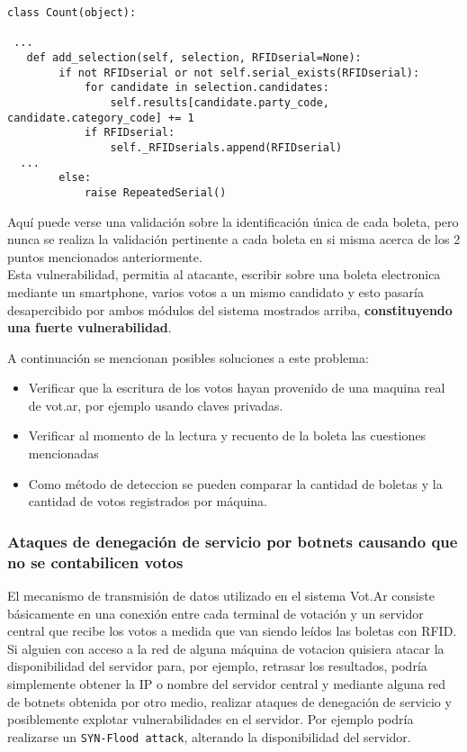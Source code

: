 \begin{lstlisting}
class Count(object):

 ...
   def add_selection(self, selection, RFIDserial=None):
        if not RFIDserial or not self.serial_exists(RFIDserial):
            for candidate in selection.candidates:
                self.results[candidate.party_code, candidate.category_code] += 1
            if RFIDserial:
                self._RFIDserials.append(RFIDserial)
  ...
        else:
            raise RepeatedSerial()
\end{lstlisting}

Aquí puede verse una validación sobre la identificación única de cada boleta, pero nunca se realiza la validación pertinente a cada boleta en si misma acerca de los 2 puntos mencionados anteriormente.\\

Esta vulnerabilidad, permitia al atacante, escribir sobre una boleta electronica mediante un smartphone, varios votos a un mismo candidato y esto pasaría desapercibido por ambos módulos del sistema mostrados arriba, \textbf{constituyendo una fuerte vulnerabilidad}.

A continuación se mencionan posibles soluciones a este problema:

\begin{itemize}
	\item Verificar que la escritura de los votos hayan provenido de una maquina real de vot.ar, por ejemplo usando claves privadas.
	\item Verificar al momento de la lectura y recuento de la boleta las cuestiones mencionadas
	\item Como método de deteccion se pueden comparar la cantidad de boletas y la cantidad de votos registrados por máquina.
\end{itemize}


\subsubsection{Ataques de denegación de servicio por botnets causando que no se contabilicen votos}

El mecanismo de transmisión de datos utilizado en el sistema Vot.Ar consiste básicamente en una conexión entre cada terminal de votación y un servidor central que recibe los votos a medida que van siendo leídos las boletas con RFID. \\

Si alguien con acceso a la red de alguna máquina de votacion quisiera atacar la disponibilidad del servidor para, por ejemplo, retrasar los resultados, podría simplemente obtener la IP o nombre del servidor central y mediante alguna red de botnets obtenida por otro medio, realizar ataques de denegación de servicio y posiblemente explotar vulnerabilidades en el servidor. Por ejemplo podría realizarse un \texttt{SYN-Flood attack}, alterando la disponibilidad del servidor.
	
